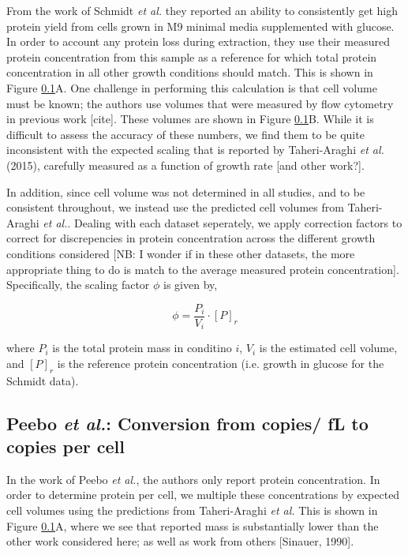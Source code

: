 \documentclass[11pt, letterpaper]{article}
\begin{document}
From the work of Schmidt {\it et al.} they reported an ability to consistently get high
protein yield from cells grown in M9 minimal media supplemented with glucose. In order
to account any protein loss during extraction, they use their measured protein concentration
from this sample as a reference for which total protein concentration in all other growth
conditions should match. This is shown in Figure \ref{}A. One challenge in
performing this calculation is that cell volume must be known; the authors use
volumes that were  measured by flow cytometry in previous work [cite]. These
volumes are shown in Figure \ref{}B. While it is difficult to assess the
accuracy of these numbers, we find them to be quite inconsistent with the
expected scaling that is reported by Taheri-Araghi {\it et al.} (2015),
carefully
measured as a function of growth rate [and other work?].

In addition,  since cell volume was not determined in all studies, and to be
consistent throughout, we instead use the predicted cell volumes from
Taheri-Araghi {\it et al.}. Dealing with each dataset seperately, we apply
correction  factors to correct for discrepencies in protein concentration across
the different growth conditions considered [NB: I wonder if in these other
datasets, the more appropriate thing to do is match to the average measured
protein concentration]. Specifically, the scaling factor $\phi$ is given by,

\begin{equation}
\phi  =  \frac{P_i}{V_i} \cdot [P]_r
\end{equation}

where $P_i$ is the total protein mass in conditino $i$, $V_i$ is the estimated cell volume, and $[P]_r$ is
the reference protein concentration (i.e. growth in  glucose for the Schmidt data).


\subsection{Peebo {\it et al.}: Conversion from copies/ fL to copies per cell}

In the work of Peebo {\it et al.}, the authors only report protein concentration.
In  order to determine protein per cell, we multiple these concentrations by
expected cell volumes  using the predictions from  Taheri-Araghi {\it et al.} This is
shown in Figure \ref{}A, where we see that reported mass is substantially lower than
the other work considered here; as well as work from others [Sinauer, 1990].
\end{document}

